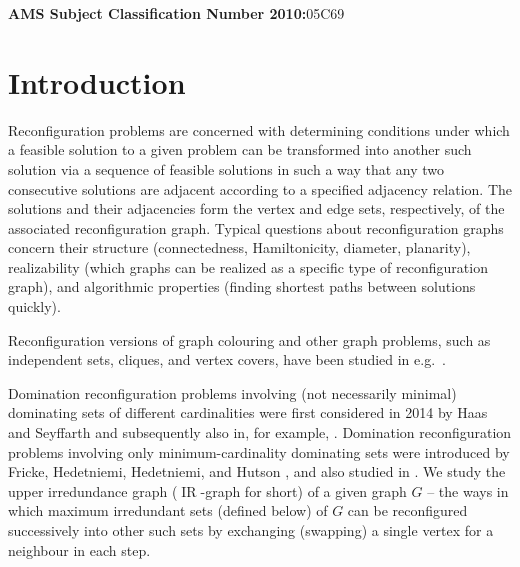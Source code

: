 \documentclass[12pt]{article}%
\begin{document}
\noindent\textbf{AMS Subject Classification Number 2010:\hspace{0.1in}}05C69

\section{Introduction}

\label{Sec_Intro}Reconfiguration problems are concerned with determining
conditions under which a feasible solution to a given problem can be
transformed into another such solution via a sequence of feasible solutions in
such a way that any two consecutive solutions are adjacent according to a
specified adjacency relation. The solutions and their adjacencies form the
vertex and edge sets, respectively, of the associated reconfiguration graph.
Typical questions about reconfiguration graphs concern their structure
(connectedness, Hamiltonicity, diameter, planarity), realizability (which
graphs can be realized as a specific type of reconfiguration graph), and
algorithmic properties (finding shortest paths between solutions quickly). 

Reconfiguration versions of graph colouring and other graph problems, such as
independent sets, cliques, and vertex covers, have been studied in
e.g.~\cite{Beier, BC2, CHJ1, CHJ2, Ito2, IKD}.

Domination reconfiguration problems involving (not necessarily minimal)
dominating sets of different cardinalities were first considered in 2014 by
Haas and Seyffarth \cite{HS1} and subsequently also in, for example,
\cite{davood, HS2, haddadan-2015, MRT}. Domination reconfiguration problems
involving only minimum-cardinality dominating sets were introduced by Fricke,
Hedetniemi, Hedetniemi, and Hutson \cite{FHHH11}, and also studied in
\cite{Bien, CHH10, Dyck, EdThesis, Laksh, Laura1, Amu, SS08, SMN}. We study
the upper irredundance graph ($\operatorname{IR}$-graph for short) of a given
graph $G$ -- the ways in which maximum irredundant sets (defined below) of $G$
can be reconfigured successively into other such sets by exchanging (swapping)
a single vertex for a neighbour in each step.
\end{document}

